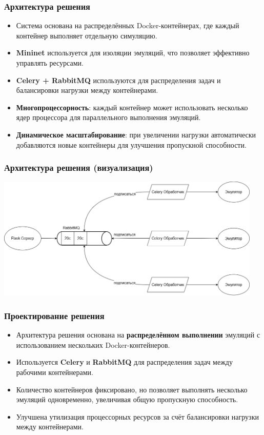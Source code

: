\documentclass{beamer}
\begin{document}
\begin{frame}[fragile]
  \frametitle{Архитектура решения}
  \begin{itemize}
    \item Система основана на распределённых Docker-контейнерах, где каждый контейнер выполняет отдельную симуляцию.
    \item \textbf{Mininet} используется для изоляции эмуляций, что позволяет эффективно управлять ресурсами.
    \item \textbf{Celery + RabbitMQ} используются для распределения задач и балансировки нагрузки между контейнерами.
    \item \textbf{Многопроцессорность}: каждый контейнер может использовать несколько ядер процессора для параллельного выполнения эмуляций.
    \item \textbf{Динамическое масштабирование}: при увеличении нагрузки автоматически добавляются новые контейнеры для улучшения пропускной способности.
  \end{itemize}
\end{frame}


\begin{frame}[fragile]
  \frametitle{Архитектура решения (визуализация)}
  \begin{center}
    \includegraphics[width=0.95\textwidth]{parallel3.png}
  \end{center}
\end{frame}

\begin{frame}[fragile]
  \frametitle{Проектирование решения}
  \begin{itemize}
    \item Архитектура решения основана на \textbf{распределённом выполнении} эмуляций с использованием нескольких Docker-контейнеров.
    \item Используется \textbf{Celery} и \textbf{RabbitMQ} для распределения задач между рабочими контейнерами.
    \item Количество контейнеров фиксировано, но позволяет выполнять несколько эмуляций одновременно, увеличивая общую пропускную способность.
    \item Улучшена утилизация процессорных ресурсов за счёт балансировки нагрузки между контейнерами.
  \end{itemize}
\end{frame}
\end{document}
